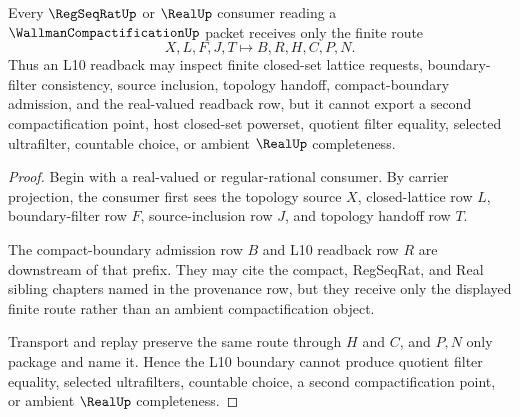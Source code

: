 \begin{theorem}
\label{thm:wallman-compactification-l10-boundary}
Every $\RegSeqRatUp$ or $\RealUp$ consumer reading a $\WallmanCompactificationUp$ packet receives only the finite route
$$
X,L,F,J,T \longmapsto B,R,H,C,P,N .
$$
Thus an L10 readback may inspect finite closed-set lattice requests, boundary-filter consistency, source inclusion, topology handoff, compact-boundary admission, and the real-valued readback row, but it cannot export a second compactification point, host closed-set powerset, quotient filter equality, selected ultrafilter, countable choice, or ambient $\RealUp$ completeness.
\end{theorem}
\begin{proof}
Begin with a real-valued or regular-rational consumer. By carrier projection, the consumer first sees the topology source $X$, closed-lattice row $L$, boundary-filter row $F$, source-inclusion row $J$, and topology handoff row $T$.

The compact-boundary admission row $B$ and L10 readback row $R$ are downstream of that prefix. They may cite the compact, RegSeqRat, and Real sibling chapters named in the provenance row, but they receive only the displayed finite route rather than an ambient compactification object.

Transport and replay preserve the same route through $H$ and $C$, and $P,N$ only package and name it. Hence the L10 boundary cannot produce quotient filter equality, selected ultrafilters, countable choice, a second compactification point, or ambient $\RealUp$ completeness.
\end{proof}




